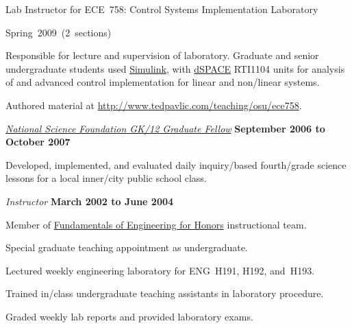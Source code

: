\documentclass[10pt]{article}           %
\begin{document}
\begin{outerlist}
\begin{innerlist}
        \item Lab Instructor for ECE~758: Control Systems Implementation
            Laboratory
        \begin{innerlist}
            \item Spring~2009~(2~sections)


            \item Responsible for lecture and supervision of laboratory.
                Graduate and senior undergraduate students used
                \href{http://www.mathworks.com/products/simulink/}{Simulink},
                with \href{http://www.dspaceinc.com/}{dSPACE} RTI1104
                units for analysis of and advanced control implementation
                for linear and non\-/linear systems.

            \item Authored material at
                \url{http://www.tedpavlic.com/teaching/osu/ece758}.
        \end{innerlist}
    \end{innerlist}

\item[] \href{http://www.nsfgk12.org/}
        {\emph{National Science Foundation GK\-/12 Graduate Fellow}}
        \hfill \textbf{September 2006 to October 2007}
\begin{innerlist}
    \item[] Developed, implemented, and evaluated daily inquiry\-/based
        fourth\-/grade science lessons for a local inner\-/city public
        school class.
\end{innerlist}

\item[] \textit{Instructor}%
        \hfill \textbf{March 2002 to June 2004}
\begin{innerlist}
\item Member of \href{http://feh.eng.ohio-state.edu/}
                     {Fundamentals of Engineering for Honors}
      instructional team.
\item Special graduate teaching appointment as undergraduate.
\item Lectured weekly engineering laboratory for ENG~H191,
        H192, and~H193.
\item Trained in\-/class undergraduate teaching assistants in laboratory
        procedure.
\item Graded weekly lab reports and provided laboratory exams.
\end{innerlist}


\end{outerlist}
\end{document}
